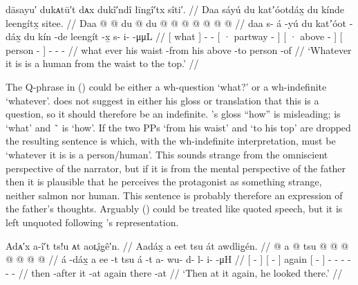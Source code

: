 \ex\label{ex:100-146-human-waist-to-top}%
%
\begingl
	\glpreamble	dāsayu′ dukᴀtū′t dᴀx dukî′ndî łīngî′tx sîti′. //
	\glpreamble	Daa sáyú du katʼóotdáx̱ du kínde leengítx̱ sitee. //
	\gla	{} Daa {}  @ {} @ {} 
		{} du  @ {} {}
		{} du  @ {} {}
		{}  @ {} {}
		 @ {} @ {} @ {} @ {} @ {} //
	\glb	{} daa {} s- á -yú
		{} du katʼóot -dáx̱ {}
		{} du kín -de {}
		{} leengít -x̱ {}
		s- i-  -μμL //
	\glc	{}[ what {}] -  -
		{}[ · partway - {}]
		{}[ · above - {}]
		{}[ person - {}]
		- -  - //
	\gld	{} what {} ever  {}
		{} his waist -from {}
		{} his above -to {}
		{} person -of {}
		 {} {} {} //
	\glft	‘Whatever it is is a human from the waist to the top.’
		//
\endgl
\xe

The Q-phrase  in (\lastx) could be either a wh-question ‘what?’ or a wh-indefinite ‘whatever’.
\citeauthor{swanton:1909} does not suggest in either his gloss or translation that this is a question, so it should therefore be an indefinite.
\citeauthor{swanton:1909}’s gloss “how” is misleading;  is ‘what’ and  \~\  is ‘how’.
If the two PPs  ‘from his waist’ and  ‘to his top’ are dropped the resulting sentence is  which, with the wh-indefinite interpretation, must be ‘whatever it is is a person/human’.
This sounds strange from the omniscient perspective of the narrator, but if it is from the mental perspective of the father then it is plausible that he perceives the protagonist as something strange, neither salmon nor human.
This sentence is probably therefore an expression of the father’s thoughts.
Arguably (\lastx) could be treated like quoted speech, but it is left unquoted following \citeauthor{swanton:1909}’s representation.

\ex\label{ex:100-147-look-there-again}%
%
\begingl
	\glpreamble	Adᴀ′x a-î′t ts!u ᴀt aoʟ̣îg̣ê′n. //
	\glpreamble	Aadáx̱ a eet tsu át awdlig̱én. //
	\gla	{}  @ {} {}
		{} a  @ {} {} tsu
		{}  @ {} {}
		 @ {} @ {} @ {} @ {} @ {} @ {} //
	\glb	{} á -dáx̱ {}
		{} a ee -t {} tsu
		{} á -t {}
		a- wu- d- l- i-  -μH //
	\glc	{}[  - {}]
		{}[   - {}] again
		{}[  - {}]
		- - - - -  - //
	\gld	{} then -after {}
		{} it {} -at {} again
		{} there -at {}
		 {} {} {} {} {} {} //
	\glft	‘Then at it again, he looked there.’
		//
\endgl
\xe

